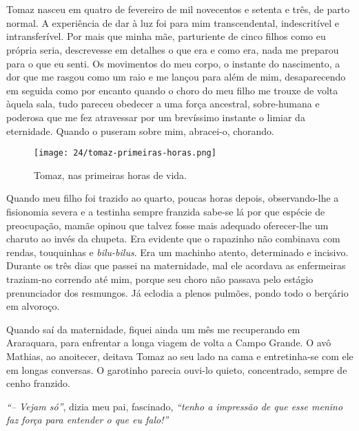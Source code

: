 \chapter{}

Tomaz nasceu em quatro de fevereiro de mil novecentos e setenta e três, de parto normal.
A experiência de dar à luz foi para mim transcendental, indescritível e intransferível.
Por mais que minha mãe, parturiente de cinco filhos como eu própria seria, descrevesse em detalhes o que era e como era, nada me preparou para o que eu senti.
Os movimentos do meu corpo, o instante do nascimento, a dor que me rasgou como um raio e me lançou para além de mim, desaparecendo em seguida como por encanto quando o choro do meu filho me trouxe de volta àquela sala, tudo pareceu obedecer a uma força ancestral, sobre-humana e poderosa que me fez atravessar por um brevíssimo instante o limiar da eternidade.
Quando o puseram sobre mim, abracei-o, chorando.

\begin{figure}
\centering
\texttt{[image: 24/tomaz-primeiras-horas.png]}
\caption{Tomaz, nas primeiras horas de vida.}
\end{figure}

Quando meu filho foi trazido ao quarto, poucas horas depois, observando-lhe a fisionomia severa e a testinha sempre franzida sabe-se lá por que espécie de preocupação, mamãe opinou que talvez fosse mais adequado oferecer-lhe um charuto ao invés da chupeta.
Era evidente que o rapazinho não combinava com rendas, touquinhas e \textit{bilu-bilus}.
Era um machinho atento, determinado e incisivo.
Durante os três dias que passei na maternidade, mal ele acordava as enfermeiras traziam-no correndo até mim, porque seu choro não passava pelo estágio prenunciador dos resmungos.
Já eclodia a plenos pulmões, pondo todo o berçário em alvoroço.

Quando saí da maternidade, fiquei ainda um mês me recuperando em Araraquara, para enfrentar a longa viagem de volta a Campo Grande.
O avô Mathias, ao anoitecer, deitava Tomaz ao seu lado na cama e entretinha-se com ele em longas conversas.
O garotinho parecia ouvi-lo quieto, concentrado, sempre de cenho franzido.

\textit{``-- Vejam só''}, dizia meu pai, fascinado,  \textit{``tenho a impressão de que esse menino faz força para entender o que eu falo!''}

